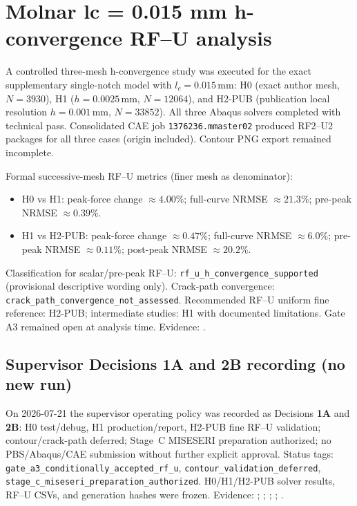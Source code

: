 \documentclass[11pt,a4paper]{article}
\begin{document}
\section{Molnar lc = 0.015 mm h-convergence RF--U analysis}
\label{sec:molnar-lc015-hconv}

A controlled three-mesh h-convergence study was executed for the exact supplementary single-notch model with \(l_c = 0.015\,\mathrm{mm}\):
H0 (exact author mesh, \(N=3930\)), H1 (\(h=0.0025\,\mathrm{mm}\), \(N=12064\)), and H2-PUB (publication local resolution \(h=0.001\,\mathrm{mm}\), \(N=33852\)).
All three Abaqus solvers completed with technical pass.
Consolidated CAE job \texttt{1376236.mmaster02} produced RF2--U2 packages for all three cases (origin included). Contour PNG export remained incomplete.

Formal successive-mesh RF--U metrics (finer mesh as denominator):
\begin{itemize}
  \item H0 vs H1: peak-force change \(\approx 4.00\%\); full-curve NRMSE \(\approx 21.3\%\); pre-peak NRMSE \(\approx 0.39\%\).
  \item H1 vs H2-PUB: peak-force change \(\approx 0.47\%\); full-curve NRMSE \(\approx 6.0\%\); pre-peak NRMSE \(\approx 0.11\%\); post-peak NRMSE \(\approx 20.2\%\).
\end{itemize}
Classification for scalar/pre-peak RF--U: \texttt{rf\_u\_h\_convergence\_supported} (provisional descriptive wording only).
Crack-path convergence: \texttt{crack\_path\_convergence\_not\_assessed}.
Recommended RF--U uniform fine reference: H2-PUB; intermediate studies: H1 with documented limitations.
Gate A3 remained open at analysis time. Evidence: .

\subsection{Supervisor Decisions 1A and 2B recording (no new run)}

On 2026-07-21 the supervisor operating policy was recorded as Decisions \textbf{1A} and \textbf{2B}:
H0 test/debug, H1 production/report, H2-PUB fine RF--U validation; contour/crack-path deferred;
Stage~C MISESERI preparation authorized; no PBS/Abaqus/CAE submission without further explicit approval.
Status tags: \texttt{gate\_a3\_conditionally\_accepted\_rf\_u},
\texttt{contour\_validation\_deferred},
\texttt{stage\_c\_miseseri\_preparation\_authorized}.
H0/H1/H2-PUB solver results, RF--U CSVs, and generation hashes were frozen.
Evidence: ;
;
;
;
.
\end{document}
